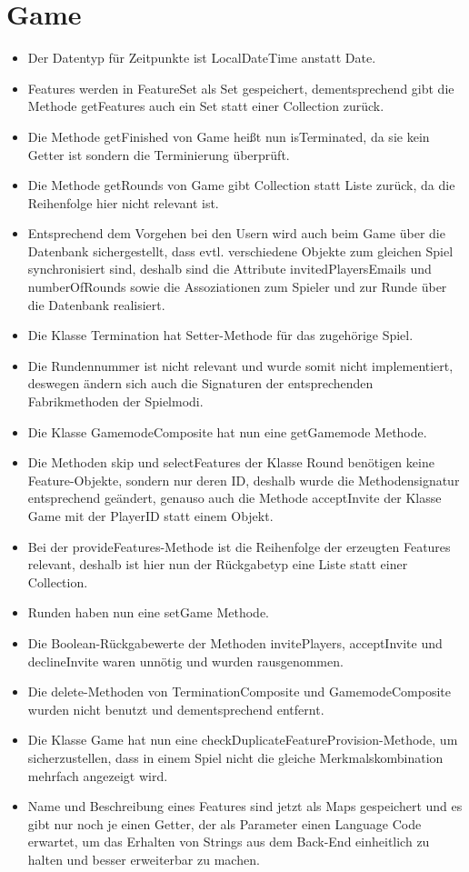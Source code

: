 \documentclass[a4paper]{scrreprt}
\begin{document}
\section{Game}
\begin{itemize}
	\item Der Datentyp für Zeitpunkte ist LocalDateTime anstatt Date.
	\item Features werden in FeatureSet als Set gespeichert, dementsprechend gibt die Methode getFeatures auch ein Set statt einer Collection zurück.
	\item Die Methode getFinished von Game heißt nun isTerminated, da sie kein Getter ist sondern die Terminierung überprüft.
	\item Die Methode getRounds von Game gibt Collection statt Liste zurück, da die Reihenfolge hier nicht relevant ist.
	\item Entsprechend dem Vorgehen bei den Usern wird auch beim Game über die Datenbank sichergestellt, dass evtl. verschiedene Objekte zum gleichen Spiel synchronisiert sind, deshalb sind die Attribute invitedPlayersEmails und numberOfRounds sowie die Assoziationen zum Spieler und zur Runde über die Datenbank realisiert.
	\item Die Klasse Termination hat Setter-Methode für das zugehörige Spiel.
	\item Die Rundennummer ist nicht relevant und wurde somit nicht implementiert, deswegen ändern sich auch die Signaturen der entsprechenden Fabrikmethoden der Spielmodi.
	\item Die Klasse GamemodeComposite hat nun eine getGamemode Methode.
	\item Die Methoden skip und selectFeatures der Klasse Round benötigen keine Feature-Objekte, sondern nur deren ID, deshalb wurde die Methodensignatur entsprechend geändert, genauso auch die Methode acceptInvite der Klasse Game mit der \newline PlayerID statt einem Objekt.
	\item Bei der provideFeatures-Methode ist die Reihenfolge der erzeugten Features relevant, deshalb ist hier nun der Rückgabetyp eine Liste statt einer Collection.
	\item Runden haben nun eine setGame Methode.
	\item Die Boolean-Rückgabewerte der Methoden invitePlayers, acceptInvite und declineInvite waren unnötig und wurden rausgenommen.
	\item Die delete-Methoden von TerminationComposite und GamemodeComposite wurden nicht benutzt und dementsprechend entfernt.
	\item Die Klasse Game hat nun eine checkDuplicateFeatureProvision-Methode, um sicherzustellen, dass in einem Spiel nicht die gleiche Merkmalskombination mehrfach angezeigt wird.
	\item Name und Beschreibung eines Features sind jetzt als Maps gespeichert und es gibt nur noch je einen Getter, der als Parameter einen Language Code erwartet, um das Erhalten von Strings aus dem Back-End einheitlich zu halten und besser erweiterbar zu machen.
\end{itemize}
\end{document}
